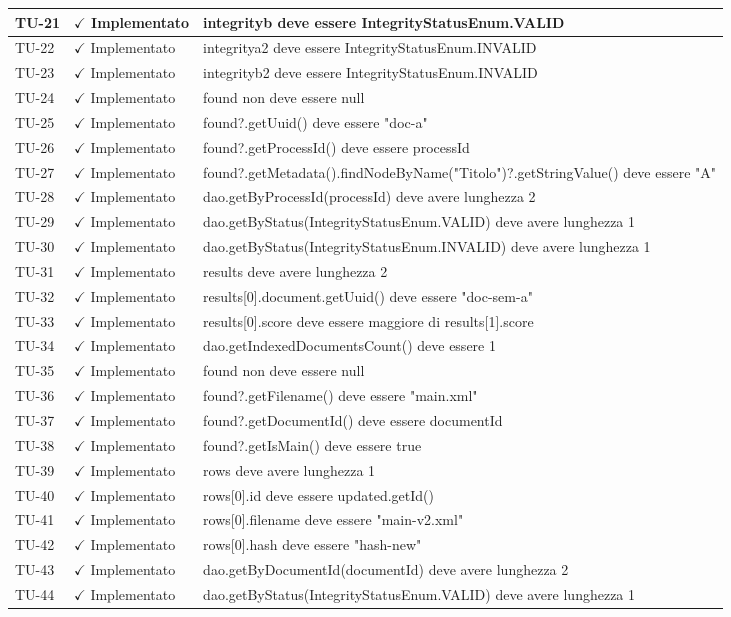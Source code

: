 ﻿\documentclass[a4paper,12pt]{article}
\newcommand{\ok}{\textcolor{green!60!black}{$\checkmark$ Implementato}}
\begin{document}
\begin{longtable}{|p{2cm}|p{3.5cm}|p{9.5cm}|}
\hline
TU-21 & \ok & integrityb deve essere IntegrityStatusEnum.VALID \\
\hline
TU-22 & \ok & integritya2 deve essere IntegrityStatusEnum.INVALID \\
\hline
TU-23 & \ok & integrityb2 deve essere IntegrityStatusEnum.INVALID \\
\hline
TU-24 & \ok & found non deve essere null \\
\hline
TU-25 & \ok & found?.getUuid() deve essere "doc-a" \\
\hline
TU-26 & \ok & found?.getProcessId() deve essere processId \\
\hline
TU-27 & \ok & found?.getMetadata().findNodeByName("Titolo")?.getStringValue() deve essere "A" \\
\hline
TU-28 & \ok & dao.getByProcessId(processId) deve avere lunghezza 2 \\
\hline
TU-29 & \ok & dao.getByStatus(IntegrityStatusEnum.VALID) deve avere lunghezza 1 \\
\hline
TU-30 & \ok & dao.getByStatus(IntegrityStatusEnum.INVALID) deve avere lunghezza 1 \\
\hline
TU-31 & \ok & results deve avere lunghezza 2 \\
\hline
TU-32 & \ok & results[0].document.getUuid() deve essere "doc-sem-a" \\
\hline
TU-33 & \ok & results[0].score deve essere maggiore di results[1].score \\
\hline
TU-34 & \ok & dao.getIndexedDocumentsCount() deve essere 1 \\
\hline
TU-35 & \ok & found non deve essere null \\
\hline
TU-36 & \ok & found?.getFilename() deve essere "main.xml" \\
\hline
TU-37 & \ok & found?.getDocumentId() deve essere documentId \\
\hline
TU-38 & \ok & found?.getIsMain() deve essere true \\
\hline
TU-39 & \ok & rows deve avere lunghezza 1 \\
\hline
TU-40 & \ok & rows[0].id deve essere updated.getId() \\
\hline
TU-41 & \ok & rows[0].filename deve essere "main-v2.xml" \\
\hline
TU-42 & \ok & rows[0].hash deve essere "hash-new" \\
\hline
TU-43 & \ok & dao.getByDocumentId(documentId) deve avere lunghezza 2 \\
\hline
TU-44 & \ok & dao.getByStatus(IntegrityStatusEnum.VALID) deve avere lunghezza 1 \\

\end{longtable}
\end{document}
